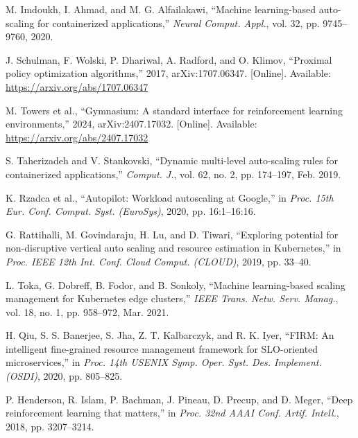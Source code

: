 \begin{enumerate}[label={[\arabic*]}, leftmargin=2.4em, itemsep=0.4em]
\item\label{imdoukh2020lstm} M. Imdoukh, I. Ahmad, and M. G. Alfailakawi, ``Machine learning-based auto-scaling for containerized applications,'' \textit{Neural Comput. Appl.}, vol. 32, pp. 9745--9760, 2020.

\item\label{schulman2017ppo} J. Schulman, F. Wolski, P. Dhariwal, A. Radford, and O. Klimov, ``Proximal policy optimization algorithms,'' 2017, arXiv:1707.06347. [Online]. Available: \url{https://arxiv.org/abs/1707.06347}

\item\label{towers2024gymnasium} M. Towers et al., ``Gymnasium: A standard interface for reinforcement learning environments,'' 2024, arXiv:2407.17032. [Online]. Available: \url{https://arxiv.org/abs/2407.17032}

\item\label{taherizadeh2019dynamic} S. Taherizadeh and V. Stankovski, ``Dynamic multi-level auto-scaling rules for containerized applications,'' \textit{Comput. J.}, vol. 62, no. 2, pp. 174--197, Feb. 2019.

\item\label{rzadca2020autopilot} K. Rzadca et al., ``Autopilot: Workload autoscaling at Google,'' in \textit{Proc. 15th Eur. Conf. Comput. Syst. (EuroSys)}, 2020, pp. 16:1--16:16.

\item\label{rattihalli2019vertical} G. Rattihalli, M. Govindaraju, H. Lu, and D. Tiwari, ``Exploring potential for non-disruptive vertical auto scaling and resource estimation in Kubernetes,'' in \textit{Proc. IEEE 12th Int. Conf. Cloud Comput. (CLOUD)}, 2019, pp. 33--40.

\item\label{toka2021edge} L. Toka, G. Dobreff, B. Fodor, and B. Sonkoly, ``Machine learning-based scaling management for Kubernetes edge clusters,'' \textit{IEEE Trans. Netw. Serv. Manag.}, vol. 18, no. 1, pp. 958--972, Mar. 2021.

\item\label{qiu2020firm} H. Qiu, S. S. Banerjee, S. Jha, Z. T. Kalbarczyk, and R. K. Iyer, ``FIRM: An intelligent fine-grained resource management framework for SLO-oriented microservices,'' in \textit{Proc. 14th USENIX Symp. Oper. Syst. Des. Implement. (OSDI)}, 2020, pp. 805--825.

\item\label{henderson2018matters} P. Henderson, R. Islam, P. Bachman, J. Pineau, D. Precup, and D. Meger, ``Deep reinforcement learning that matters,'' in \textit{Proc. 32nd AAAI Conf. Artif. Intell.}, 2018, pp. 3207--3214.


\end{enumerate}
